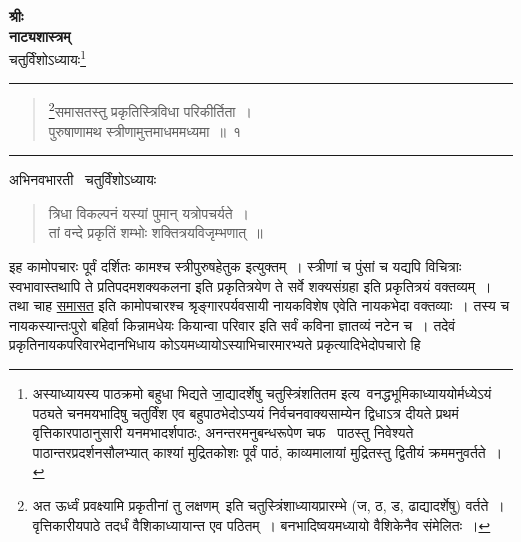 \documentclass[11pt, openany]{book}
\begin{document}
\newpage
\thispagestyle{empty}
\begin{center}
\textbf{\large श्रीः}\\

\vspace{2mm}
\textbf{\huge नाट्यशास्त्रम्}\\

\vspace{2mm}
चतुर्विंशोऽध्यायः\renewcommand{\thefootnote}{*}\footnote{अस्याध्यायस्य पाठक्रमो बहुधा भिद्यते जा॒द्यादर्शेषु चतुस्त्रिंशतितम इत्य\textendash\ वनद्धभूमिकाध्याययोर्मध्येऽयं पठ्यते चनमयभादिषु चतुर्विंश एव बहुपाठभेदोऽप्ययं निर्वचनवाक्यसाम्येन द्विधाऽत्र दीयते प्रथमं वृत्तिकारपाठानुसारी यनमभादर्शपाठः, अनन्तरमनुबन्धरूपेण चफ \textendash\  पाठस्तु निवेश्यते पाठान्तरप्रदर्शनसौलभ्यात् काश्यां मुद्रितकोशः पूर्वं पाठं, काव्यमालायां मुद्रितस्तु द्वितीयं क्रममनुवर्तते~।}\\

\rule{0.2\linewidth}{0.5pt}
\end{center}

\begin{quote}
{\na \renewcommand{\thefootnote}{1}\footnote{अत ऊर्ध्वं प्रवक्ष्यामि प्रकृतीनां तु लक्षणम्\textendash\ इति चतुस्त्रिंशाध्यायप्रारम्भे (ज, ठ, ड, ढाद्यादर्शेषु) वर्तते~। वृत्तिकारीयपाठे तदर्धं वैशिकाध्यायान्त एव पठितम्~। बनभादिष्वयमध्यायो वैशिकेनैव संमेलितः~।}समासतस्तु प्रकृतिस्त्रिविधा परिकीर्तिता~।\\
पुरुषाणामथ स्त्रीणामुत्तमाधममध्यमा~॥~१}
\end{quote}

\hrule

\begin{center}
अभिनवभारती \textendash\  चतुर्विंशोऽध्यायः 
\end{center}

\begin{quote}
{\qt त्रिधा विकल्पनं यस्यां पुमान् यत्रोपचर्यते~।\\
तां वन्दे प्रकृतिं शम्भोः शक्तित्रयविजृम्भणात्~॥}
\end{quote}

इह कामोपचारः पूर्वं दर्शितः कामश्च स्त्रीपुरुषहेतुक इत्युक्तम्~। स्त्रीणां च पुंसां च यद्यपि विचित्राः स्वभावास्तथापि ते प्रतिपदमशक्यकलना इति प्रकृतित्रयेण ते सर्वे शक्यसंग्रहा इति प्रकृतित्रयं वक्तव्यम्~। तथा चाह \underline{समासत} इति कामोपचारश्च श्रृङ्गारपर्यवसायी नायकविशेष एवेति नायकभेदा वक्तव्याः~। तस्य च नायकस्यान्तःपुरो बहिर्वा किन्नामधेयः कियान्वा परिवार इति सर्वं कविना ज्ञातव्यं नटेन च~। तदेवं प्रकृतिनायकपरिवारभेदानभिधाय कोऽयमध्यायोऽस्याभिचारमारभ्यते प्रकृत्यादिभेदोपचारो हि
\end{document}
